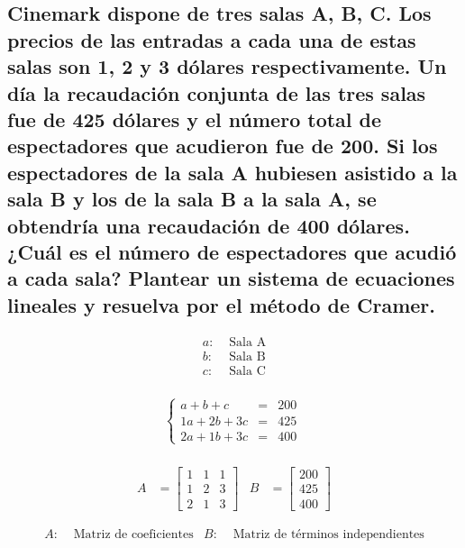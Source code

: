 \documentclass[11pt, a4paper]{article}
\begin{document}
\subsection{Cinemark dispone de tres salas A, B, C. Los precios de las entradas a cada una de estas salas son 1, 2 y 3 dólares respectivamente. Un día la recaudación conjunta de las tres salas fue de 425 dólares y el número total de espectadores que acudieron fue de 200. Si los espectadores de la sala A hubiesen asistido a la sala B y los de la sala B a la sala A, se obtendría una recaudación de 400 dólares. ¿Cuál es el número de espectadores que acudió a cada sala? Plantear un sistema de ecuaciones lineales y resuelva por el método de Cramer.}
\vspace{-0.5cm}
\begin{multicols}{3}
  \begin{align*}
    a: &\text{ Sala A}\\
    b: &\text{ Sala B}\\
    c: &\text{ Sala C}
  \end{align*}
  \columnbreak\\
  \begin{align*}
    \left\{
    \begin{array}{rcl}
      a+b+c &= &200\\
      1a+2b+3c &= &425\\
      2a+1b+3c &= &400
    \end{array}
    \right.\
  \end{align*}
  \columnbreak\\
  \begin{align*}
    A &= \begin{bmatrix}
      1 & 1 & 1\\
      1 & 2 & 3\\
      2 & 1 & 3
    \end{bmatrix}&
    B &= \begin{bmatrix}
      200\\
      425\\
      400
    \end{bmatrix}
  \end{align*}
\end{multicols}
\vspace{-1cm}
  \begin{align*}
    A: &\text{ Matriz de coeficientes}&
    B: &\text{ Matriz de términos independientes}
  \end{align*}
\end{document}
